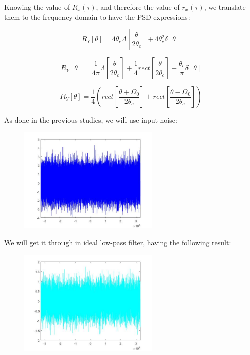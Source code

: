 \documentclass[a4paper,11pt]{article}
\begin{document}
Knowing the value of $R_x(\tau)$, and therefore the value of $r_x(\tau)$, we translate them to the frequency domain to have the PSD expressions:

\begin{equation}
  R_Y[\theta] = 4\theta_c\Lambda[\frac{\theta}{2\theta_c}]+4\theta_c^2\delta[\theta]
\end{equation}

\begin{equation}
 R_Y[\theta] = \frac{1}{4\pi}\Lambda[\frac{\theta}{2\theta_c}]+\frac{1}{4}rect[\frac{\theta} {2\theta_c}]
+\frac{\theta_c}{\pi}\delta[\theta]
\end{equation}

\begin{equation}
  R_Y[\theta] = \frac{1}{4}(rect[\frac{\theta+\Omega_{0}} {2\theta_c}]+rect[\frac{\theta-\Omega_{0}} {2\theta_c}])
\end{equation}

\newpage

As done in the previous studies, we will use input noise:

\begin{figure}[!hp]
    \begin{center}
    \includegraphics[width=0.6\textwidth]{images/lab3_figure1_1.jpg}
    \end{center}
\end{figure}

We will get it through in ideal low-pass filter, having the following result:

\begin{figure}[!hp]
    \begin{center}
    \includegraphics[width=0.6\textwidth]{images/lab3_figure1_2.jpg}
    \end{center}
\end{figure}
\end{document}
